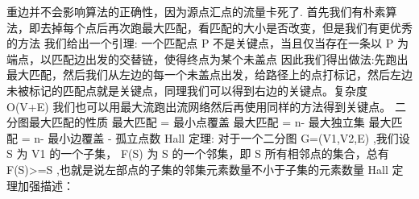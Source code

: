 {}重边并不会影响算法的正确性，因为源点汇点的流量卡死了.\markdownRendererInterblockSeparator
{}
\markdownRendererSectionEnd \markdownRendererSectionBegin
{}\markdownRendererInterblockSeparator
{}首先我们有朴素算法，即去掉每个点后再次跑最大匹配，看匹配的大小是否改变，但是我们有更优秀的方法\markdownRendererParagraphSeparator
{}我们给出一个引理:\markdownRendererParagraphSeparator
{}一个匹配点\markdownRendererDollarSign{} P\markdownRendererSoftLineBreak
{}\markdownRendererDollarSign{}不是关键点，当且仅当存在一条以\markdownRendererDollarSign{} P \markdownRendererDollarSign{}为端点，以匹配边出发的交替链，使得终点为某个未盖点\markdownRendererParagraphSeparator
{}因此我们得出做法:先跑出最大匹配，然后我们从左边的每一个未盖点出发，给路径上的点打标记，然后左边未被标记的匹配点就是关键点，同理我们可以得到右边的关键点。复杂度\markdownRendererDollarSign{} O(V+E) \markdownRendererDollarSign{}\markdownRendererParagraphSeparator
{}我们也可以用最大流跑出流网络然后再使用同样的方法得到关键点。\markdownRendererInterblockSeparator
{}\markdownRendererInterblockSeparator
{}二分图最大匹配的性质\markdownRendererParagraphSeparator
{}最大匹配 \markdownRendererDollarSign{}=\markdownRendererDollarSign{} 最小点覆盖\markdownRendererParagraphSeparator
{}最大匹配 \markdownRendererDollarSign{}= n-\markdownRendererDollarSign{} 最大独立集\markdownRendererParagraphSeparator
{}最大匹配 \markdownRendererDollarSign{}= n-\markdownRendererDollarSign{} 最小边覆盖 \markdownRendererDollarSign{}-\markdownRendererDollarSign{} 孤立点数\markdownRendererParagraphSeparator
{}\markdownRendererDollarSign{}Hall\markdownRendererDollarSign{} 定理:\markdownRendererParagraphSeparator
{}对于一个二分图\markdownRendererDollarSign{} G=(V1,V2,E) \markdownRendererDollarSign{},我们设\markdownRendererDollarSign{} S \markdownRendererDollarSign{}为\markdownRendererDollarSign{} V1 \markdownRendererDollarSign{}的一个子集，\markdownRendererDollarSign{} F(S) \markdownRendererDollarSign{}为\markdownRendererDollarSign{} S \markdownRendererDollarSign{}的一个邻集，即\markdownRendererDollarSign{} S \markdownRendererDollarSign{}所有相邻点的集合，总有\markdownRendererDollarSign{} \markdownRendererPipe{}F(S)\markdownRendererPipe{}>=\markdownRendererPipe{}S\markdownRendererPipe{} \markdownRendererDollarSign{},也就是说左部点的子集的邻集元素数量不小于子集的元素数量\markdownRendererParagraphSeparator
{}\markdownRendererDollarSign{} Hall \markdownRendererDollarSign{}定理加强描述：\markdownRendererParagraphSeparator
